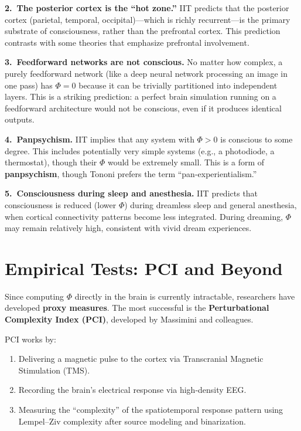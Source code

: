 \documentclass[11pt,a4paper]{report}
\newcommand{\Phi}{\varPhi}
\begin{document}
\textbf{2.\ The posterior cortex is the ``hot zone.''} IIT predicts that the posterior cortex (parietal, temporal, occipital)---which is richly recurrent---is the primary substrate of consciousness, rather than the prefrontal cortex. This prediction contrasts with some theories that emphasize prefrontal involvement.

\textbf{3.\ Feedforward networks are not conscious.} No matter how complex, a purely feedforward network (like a deep neural network processing an image in one pass) has $\Phi = 0$ because it can be trivially partitioned into independent layers. This is a striking prediction: a perfect brain simulation running on a feedforward architecture would not be conscious, even if it produces identical outputs.

\textbf{4.\ Panpsychism.} IIT implies that any system with $\Phi > 0$ is conscious to some degree. This includes potentially very simple systems (e.g., a photodiode, a thermostat), though their $\Phi$ would be extremely small. This is a form of \textbf{panpsychism}, though Tononi prefers the term ``pan-experientialism.''

\textbf{5.\ Consciousness during sleep and anesthesia.} IIT predicts that consciousness is reduced (lower $\Phi$) during dreamless sleep and general anesthesia, when cortical connectivity patterns become less integrated. During dreaming, $\Phi$ may remain relatively high, consistent with vivid dream experiences.

\section{Empirical Tests: PCI and Beyond}

Since computing $\Phi$ directly in the brain is currently intractable, researchers have developed \textbf{proxy measures}. The most successful is the \textbf{Perturbational Complexity Index (PCI)}, developed by Massimini and colleagues.

PCI works by:
\begin{enumerate}[leftmargin=2em]
  \item Delivering a magnetic pulse to the cortex via Transcranial Magnetic Stimulation (TMS).
  \item Recording the brain's electrical response via high-density EEG.
  \item Measuring the ``complexity'' of the spatiotemporal response pattern using Lempel--Ziv complexity after source modeling and binarization.
\end{enumerate}
\end{document}
